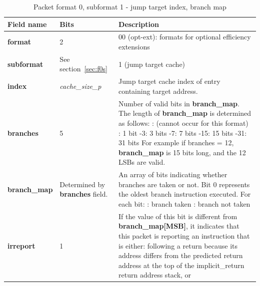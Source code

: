 \begin{table}[htp]
  \centering
  \caption{Packet format 0, subformat 1 - jump target index, branch map}
  \label{tab:te_inst0-1-cache-map}
  \begin{tabulary}{\textwidth}{|l|p{35mm}|p{90mm}|}
    \hline
    {\bf Field name} & {\bf Bits} & {\bf Description} \\
    \hline
    \textbf{format}	& 2	& 00 (opt-ext): formats for optional efficiency extensions\\
    \hline
     \textbf{subformat}  & See section~\ref{sec:f0s} & 1 (jump target cache)\\
     \hline
    \textbf{index} & \textit {\textit{cache\_size\_p}} & 
              Jump target cache index of entry containing target address.\\ 
    \hline
    \textbf{branches} & 5 & Number of valid bits in \textbf{branch\_map}. The length of \textbf{branch\_map} is determined as follows: :	   (cannot occur for this format) :	   1 bit -3:   3 bits -7:   7 bits -15:  15 bits -31: 31 bits \newline
    For example if branches = 12, \textbf{branch\_map} is 15 bits long, and the 12 LSBs are valid. \\
    \hline
    \textbf{branch\_map} & Determined by \newline 
                 \textbf{branches} field. & 
                 An array of bits indicating whether branches are taken or not.\newline
    Bit 0 represents the oldest branch instruction executed.   For each bit: : branch taken : branch not taken \\
    \hline
    \textbf{irreport}	& 1 & 
                If the value of this bit is different from \textbf{branch\_map[MSB]}, it indicates that this packet is
                reporting an instruction that is either: \newline
                following a return because its address differs from the predicted return address at the top of 
                the implicit\_return return address stack, or \newline

\end{tabulary}
\end{table}
